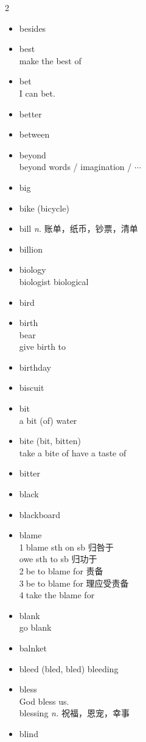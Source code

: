 \documentclass[../../book.tex]{subfiles}
\begin{document}
\begin{multicols}{2}
\begin{itemize}
\item[-] besides
\item[-] best
\\make the best of
\item[-] bet
\\I can bet.
\item[-] better
\item[-] between
\item[-] beyond
\\beyond words / imagination / $\cdots$
\item[-] big
\item[-] bike (bicycle)
\item[-] bill \emph{n.} 账单，纸币，钞票，清单
\item[-] billion
\item[-] biology
\\biologist biological
\item[-] bird
\item[-] birth
\\bear
\\give birth to
\item[-] birthday
\item[-] biscuit
\item[-] bit
\\a bit (of) water
\item[-] bite (bit, bitten)
\\take a bite of {\color{violet}have a taste of}
\item[-] bitter
\item[-] black
\item[-] blackboard
\item[-] blame
\\\textcircled{1}blame sth on sb 归咎于
\\owe sth to sb 归功于
\\\textcircled{2}be to blame for 责备
\\\textcircled{3}be to blame for 理应受责备
\\\textcircled{4}take the blame for
\item[-] blank
\\go blank
\item[-] balnket
\item[-] bleed (bled, bled) bleeding
\item[-] bless
\\God bless us.
\\blessing \emph{n.} 祝福，恩宠，幸事
\item[-] blind

\end{itemize}
\end{multicols}
\end{document}
